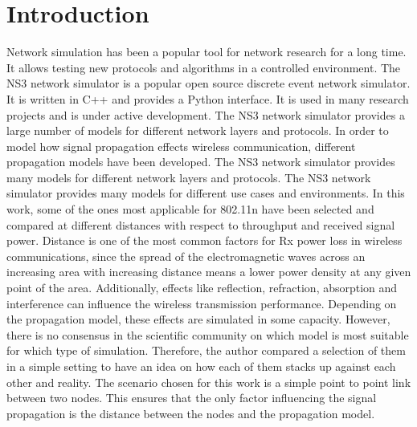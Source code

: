 \section[short]{Introduction}

Network simulation has been a popular tool for network research for a long time. It allows testing new protocols and algorithms in a controlled environment. 
The NS3 network simulator is a popular open source discrete event network simulator. It is written in C++ and provides a Python interface. 
It is used in many research projects and is under active development. The NS3 network simulator provides a large number of models for different network layers and protocols. 
In order to model how signal propagation effects wireless communication, different propagation models have been 
developed. The NS3 network simulator provides many models for different network layers and protocols. The NS3 network simulator provides many models for different 
use cases and environments. In this work, some of the ones most applicable for 802.11n have been selected and compared at different 
distances with respect to throughput and received signal power. Distance is one of the most common factors for Rx power loss in wireless communications, since 
the spread of the electromagnetic waves across an increasing area with increasing distance means a lower power density at any given point of the 
area. Additionally, effects like reflection, refraction, absorption and interference can influence the wireless transmission performance.
Depending on the propagation model, these effects are simulated in some capacity. However, there is no consensus in the scientific community on 
which model is most suitable for which type of simulation. Therefore, the author compared a selection of them in a simple setting to have an idea 
on how each of them stacks up against each other and reality.
The scenario chosen for this work is a simple point to point link between two nodes. 
This ensures that the only factor influencing the signal propagation is the distance between the nodes 
and the propagation model.
